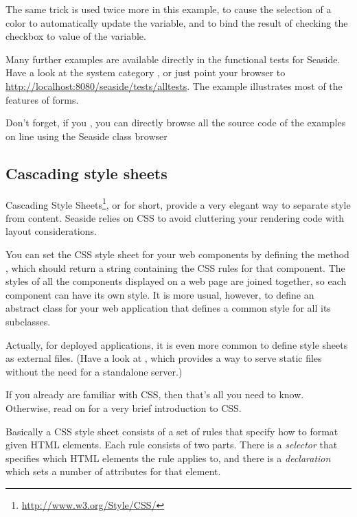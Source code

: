 \documentclass[a4paper,10pt,twoside]{book}
\begin{document}
The same trick is used twice more in this example, to cause the selection of a color to automatically update the  variable, and to bind the result of checking the checkbox to value of the  variable.

Many further examples are available directly in the functional tests for Seaside.
Have a look at the system category , or just point your browser to \url{http://localhost:8080/seaside/tests/alltests}.
The  example illustrates most of the features of forms.

Don't forget, if you , you can directly browse all the source code of the examples on line using the Seaside class browser

\subsection{Cascading style sheets}
\label{sec:css}

Cascading Style Sheets\footnote{\url{http://www.w3.org/Style/CSS/}}, or  for short, provide a very elegant way to separate style from content.
Seaside relies on CSS to avoid cluttering your rendering code with layout considerations.

You can set the CSS style sheet for your web components by defining the method , which should return a string containing the CSS rules for that component.
The styles of all the components displayed on a web page are joined together, so each component can have its own style.
It is more usual, however, to define an abstract class for your web application that defines a common style for all its subclasses.

Actually, for deployed applications, it is even more common to define style sheets as external files.
(Have a look at , which provides a way to serve static files without the need for a standalone server.)

If you already are familiar with CSS, then that's all you need to know.
Otherwise, read on for a very brief introduction to CSS.

Basically a CSS style sheet consists of a set of rules that specify how to format given HTML elements.
Each rule consists of two parts.
There is a \emph{selector} that specifies which HTML elements the rule applies to, and there is a \emph{declaration} which sets a number of attributes for that element.
\end{document}
